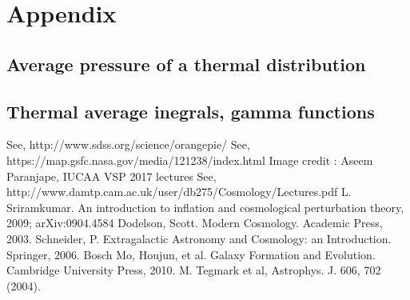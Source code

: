 \documentclass[12pt,a4paper,oneside]{book}
\begin{document}
\section{Appendix}
\subsection{ Average pressure of a thermal distribution}
\subsection{Thermal average inegrals, gamma functions}
\begin{thebibliography}{99}
\bibitem{[1]} See, http://www.sdss.org/science/orangepie/
\bibitem{[2]} See, https://map.gsfc.nasa.gov/media/121238/index.html
\bibitem{[3]} Image credit : Aseem Paranjape, IUCAA VSP 2017 lectures
 See, http://www.damtp.cam.ac.uk/user/db275/Cosmology/Lectures.pdf
L. Sriramkumar.
\newblock An introduction to inflation and cosmological perturbation theory, 2009;
\newblock arXiv:0904.4584
\bibitem{[5]} Dodelson, Scott. Modern Cosmology. Academic Press, 2003.
\bibitem{}Schneider, P. Extragalactic Astronomy and Cosmology: an Introduction. Springer, 2006.
Bosch
\bibitem{}Mo, Houjun, et al. Galaxy Formation and Evolution. Cambridge University Press, 2010.
\bibitem{[9]}M. Tegmark et al, Astrophys. J. 606, 702 (2004).

\end{thebibliography}

\end{document}
